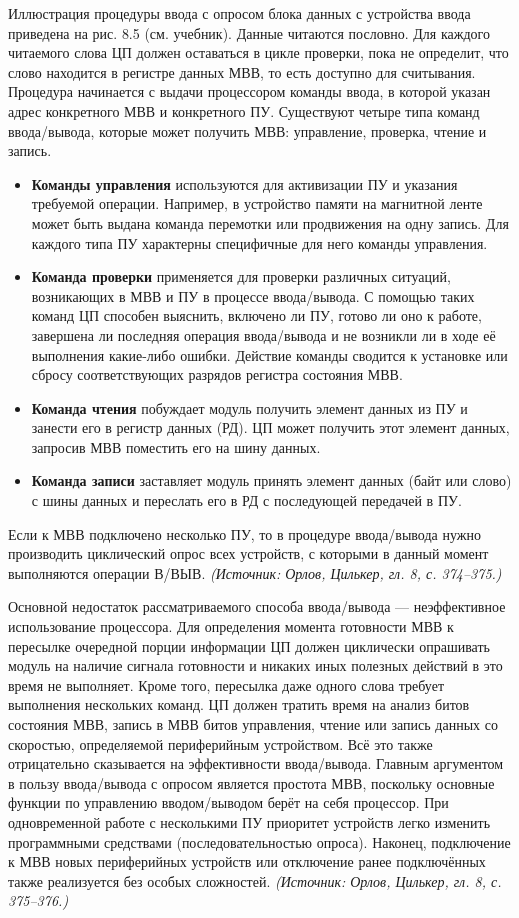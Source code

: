 \documentclass[a4paper,12pt]{article}
\begin{document}
Иллюстрация процедуры ввода с опросом блока данных с устройства ввода приведена на рис. 8.5 (см. учебник). Данные читаются пословно. Для каждого читаемого слова ЦП должен оставаться в цикле проверки, пока не определит, что слово находится в регистре данных МВВ, то есть доступно для считывания. Процедура начинается с выдачи процессором команды ввода, в которой указан адрес конкретного МВВ и конкретного ПУ. Существуют четыре типа команд ввода/вывода, которые может получить МВВ: управление, проверка, чтение и запись.
\begin{itemize}
\item \textbf{Команды управления} используются для активизации ПУ и указания требуемой операции. Например, в устройство памяти на магнитной ленте может быть выдана команда перемотки или продвижения на одну запись. Для каждого типа ПУ характерны специфичные для него команды управления.
\item \textbf{Команда проверки} применяется для проверки различных ситуаций, возникающих в МВВ и ПУ в процессе ввода/вывода. С помощью таких команд ЦП способен выяснить, включено ли ПУ, готово ли оно к работе, завершена ли последняя операция ввода/вывода и не возникли ли в ходе её выполнения какие-либо ошибки. Действие команды сводится к установке или сбросу соответствующих разрядов регистра состояния МВВ.
\item \textbf{Команда чтения} побуждает модуль получить элемент данных из ПУ и занести его в регистр данных (РД). ЦП может получить этот элемент данных, запросив МВВ поместить его на шину данных.
\item \textbf{Команда записи} заставляет модуль принять элемент данных (байт или слово) с шины данных и переслать его в РД с последующей передачей в ПУ.
\end{itemize}
Если к МВВ подключено несколько ПУ, то в процедуре ввода/вывода нужно производить циклический опрос всех устройств, с которыми в данный момент выполняются операции В/ВЫВ.
\textit{(Источник: Орлов, Цилькер, гл. 8, с. 374--375.)}

Основной недостаток рассматриваемого способа ввода/вывода — неэффективное использование процессора. Для определения момента готовности МВВ к пересылке очередной порции информации ЦП должен циклически опрашивать модуль на наличие сигнала готовности и никаких иных полезных действий в это время не выполняет. Кроме того, пересылка даже одного слова требует выполнения нескольких команд. ЦП должен тратить время на анализ битов состояния МВВ, запись в МВВ битов управления, чтение или запись данных со скоростью, определяемой периферийным устройством. Всё это также отрицательно сказывается на эффективности ввода/вывода. Главным аргументом в пользу ввода/вывода с опросом является простота МВВ, поскольку основные функции по управлению вводом/выводом берёт на себя процессор. При одновременной работе с несколькими ПУ приоритет устройств легко изменить программными средствами (последовательностью опроса). Наконец, подключение к МВВ новых периферийных устройств или отключение ранее подключённых также реализуется без особых сложностей.
\textit{(Источник: Орлов, Цилькер, гл. 8, с. 375--376.)}
\end{document}
